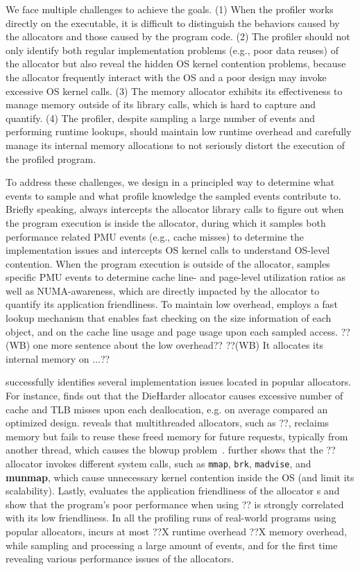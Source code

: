 We face multiple challenges to achieve the goals. (1) When the profiler works directly on the executable, it is difficult to distinguish the behaviors caused by the allocators and those caused by the program code. (2) The profiler should not only identify both regular implementation problems (e.g., poor data reuses) of the allocator but also reveal the hidden OS kernel contention problems, because the allocator frequently interact with the OS and a poor design may invoke excessive OS kernel calls. (3) The memory allocator exhibits its effectiveness to manage memory outside of its library calls, which is hard to capture and quantify. (4) The profiler, despite sampling a large number of events and performing runtime lookups, should maintain low runtime overhead and carefully manage its internal memory allocations to not seriously distort the execution of the profiled program.

To address these challenges, we design \MP{} in a principled way to determine what events to sample and what profile knowledge the sampled events contribute to. Briefly speaking, \MP{} always intercepts the allocator library calls to figure out when the program execution is inside the allocator, during which it samples both performance related PMU events (e.g., cache misses) to determine the implementation issues and intercepts OS kernel calls to understand OS-level contention. When the program execution is outside of the allocator, \MP{} samples specific PMU events to determine cache line- and page-level utilization ratios as well as NUMA-awareness, which are directly impacted by the allocator to quantify its application friendliness. To maintain low overhead, \MP{} employs a fast lookup mechanism that enables fast checking on the size information of each object, and on the cache line usage and page usage upon each sampled access. ??(WB) one more sentence about the low overhead?? ??(WB) It allocates its internal memory on ...??

\MP{} successfully identifies several implementation issues located in popular allocators. For instance, \MP{} finds out that the DieHarder allocator causes excessive number of cache and TLB misses upon each deallocation, e.g.  on average compared an optimized design. \MP{} reveals that multithreaded allocators, such as ??, reclaims memory but fails to reuse these freed memory for future requests, typically from another thread, which causes the blowup problem~\cite{Hoard}. \MP further shows that the ??allocator invokes different system calls, such as \texttt{mmap}, \texttt{brk}, \texttt{madvise}, and \textbf{munmap}, which cause unnecessary kernel contention inside the OS (and limit its scalability). Lastly, \MP{} evaluates the application friendliness of the allocator     s and show that the program's poor performance when using ?? is strongly correlated with its low friendliness. In all the profiling runs of real-world programs using popular allocators, \MP{} incurs at most ??X runtime overhead ??X memory overhead, while sampling and processing a large amount of events, and for the first time revealing various performance issues of the allocators.

